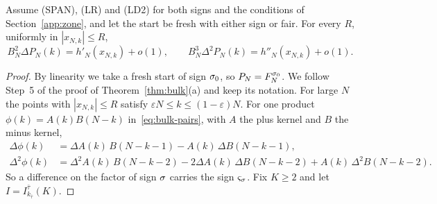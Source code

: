 \begin{theorem}\label{thm:bulk-diff}
Assume (SPAN), (LR) and (LD2) for both signs and the conditions of Section~\ref{app:zone}, and
let the start be fresh with either sign or fair. For every $R$, uniformly in $|x_{N,k}|\le R$,
\[
 B_N^2\Delta P_N(k)=h'_N(x_{N,k})+o(1),\qquad B_N^3\Delta^2P_N(k)=h''_N(x_{N,k})+o(1).
\]
\end{theorem}

\begin{proof}
By linearity we take a fresh start of sign $\sigma_0$, so $P_N=F^{\sigma_0}_N$. We follow Step~5 of
the proof of Theorem~\ref{thm:bulk}(a) and keep its notation. For large $N$ the points with
$|x_{N,k}|\le R$ satisfy $\varepsilon N\le k\le(1-\varepsilon)N$. For one product
$\phi(k)=A(k)B(N-k)$ in~\eqref{eq:bulk-pairs}, with $A$ the plus kernel and $B$ the minus kernel,
\begin{align*}
 \Delta\phi(k)&=\Delta A(k)\,B(N-k-1)-A(k)\,\Delta B(N-k-1),\\
 \Delta^2\phi(k)&=\Delta^2A(k)\,B(N-k-2)-2\Delta A(k)\,\Delta B(N-k-2)+A(k)\,\Delta^2B(N-k-2).
\end{align*}
So a difference on the factor of sign $\sigma$ carries the sign $\varsigma_\sigma$. Fix $K\ge2$ and let
$I=I^{\bar\tau}_{k_{\bar\tau}}(K)$.


\end{proof}
